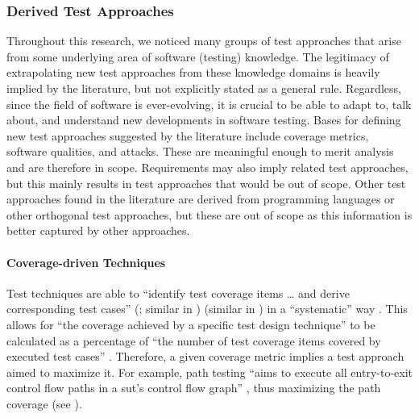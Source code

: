 \subsubsection{Derived Test Approaches}
\label{derived-tests}

Throughout this research, we noticed many groups of test approaches that arise
from some underlying area of software (testing) knowledge. The legitimacy of
extrapolating new test approaches from these knowledge domains is heavily
implied by the literature, but not explicitly stated as a general rule. Regardless,
since the field of software is ever-evolving, it is crucial to be able to
adapt to, talk about, and understand new developments in software testing.
Bases for defining new test approaches suggested by the literature include
coverage metrics, software qualities, and attacks. These are meaningful
enough to merit analysis and are therefore in scope. Requirements may also
imply related test approaches, but this mainly results in test approaches
that would be out of scope. Other test approaches found in the literature
are derived from programming languages or other orthogonal test approaches,
but these are out of scope as this information is better captured by other
approaches.

\ifnotpaper
    \paragraph{Coverage-driven Techniques}
    \label{cov-test}

    Test techniques are able to ``identify test coverage items \dots{} and
    derive corresponding test cases''
    \ifnotpaper
        (\citealp[p.~11]{IEEE2022}; similar in \citeyear[p.~467]{IEEE2017})
    \else
        \cite[p.~11]{IEEE2022} (similar in \cite[p.~467]{IEEE2017})
    \fi
    in a ``systematic'' way
    \citeyearpar[p.~464]{IEEE2017}.
    \ifnotpaper
        This allows for ``the coverage achieved by a specific test design
        technique'' to be calculated as a percentage of ``the number of test
        coverage items covered by executed test cases'' \citeyearpar[p.~30]{IEEE2021}.
    \fi %
    Therefore, a given coverage metric implies a test approach aimed to
    maximize it. For example, path testing ``aims to execute all entry-to-exit
    control flow paths in a \acs{sut}'s control flow graph'' \citep[p.~5-13]{SWEBOK2024},
    thus maximizing the path coverage
    \ifnotpaper
        \citep[see][Fig.~1]{SharmaEtAl2021}\else
        (see \cite[Fig.~1]{SharmaEtAl2021})\fi.

